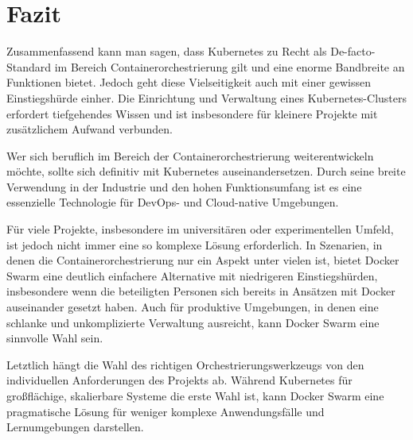 \chapter{Fazit}\label{ch:summary}

Zusammenfassend kann man sagen, dass Kubernetes zu Recht als De-facto-Standard im Bereich Containerorchestrierung gilt und eine enorme Bandbreite an Funktionen bietet. 
Jedoch geht diese Vielseitigkeit auch mit einer gewissen Einstiegshürde einher. 
Die Einrichtung und Verwaltung eines Kubernetes-Clusters erfordert tiefgehendes Wissen und ist insbesondere für kleinere Projekte mit zusätzlichem Aufwand verbunden.

Wer sich beruflich im Bereich der Containerorchestrierung weiterentwickeln möchte, sollte sich definitiv mit Kubernetes auseinandersetzen. 
Durch seine breite Verwendung in der Industrie und den hohen Funktionsumfang ist es eine essenzielle Technologie für DevOps- und Cloud-native Umgebungen.

Für viele Projekte, insbesondere im universitären oder experimentellen Umfeld, ist jedoch nicht immer eine so komplexe Lösung erforderlich. 
In Szenarien, in denen die Containerorchestrierung nur ein Aspekt unter vielen ist, bietet Docker Swarm eine deutlich einfachere Alternative mit niedrigeren Einstiegshürden, insbesondere wenn die beteiligten Personen sich bereits in Ans\"atzen mit Docker auseinander gesetzt haben. 
Auch für produktive Umgebungen, in denen eine schlanke und unkomplizierte Verwaltung ausreicht, kann Docker Swarm eine sinnvolle Wahl sein.

Letztlich hängt die Wahl des richtigen Orchestrierungswerkzeugs von den individuellen Anforderungen des Projekts ab. 
Während Kubernetes für großflächige, skalierbare Systeme die erste Wahl ist, kann Docker Swarm eine pragmatische Lösung für weniger komplexe Anwendungsfälle und Lernumgebungen darstellen.